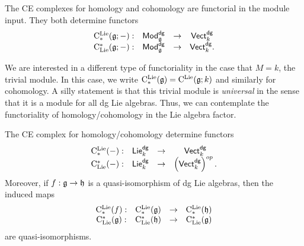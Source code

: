 \documentclass[11pt]{amsart}
\def\dgVect{{\sf Vect}^{\sf dg}}
\def\dgLie{{\sf Lie}^{\sf dg}}
\def\dgMod{{\sf Mod}^{\sf dg}}
\begin{document}
\subsubsection{}

The CE complexes for homology and cohomology are functorial in the module input.
They both determine functors
\[
\begin{array}{cccc}
\clieu_*(\fg ; -) : & \dgMod_\fg & \to & \dgVect_k\\
\clie^*(\fg ; -) : & \dgMod_{\fg} & \to & \dgVect_k .
\end{array}
\]

We are interested in a different type of functoriality in the case that $M = k$, the trivial module. 
In this case, we write ${\rm C}^{\rm Lie}_*(\mathfrak g) = {\rm C}^{\rm Lie}(\mathfrak g;k)$ and similarly for cohomology.
A silly statement is that this trivial module is {\em universal} in the sense that it is a module for all dg Lie algebras.
Thus, we can contemplate the functoriality of homology/cohomology in the Lie algebra factor. 

\begin{lem}
The CE complex for homology/cohomology determine functors
\[
\begin{array}{cccc}
\clieu_*(-) : & \dgLie_k & \to & \dgVect_k\\
\clie^*(-) : & \dgLie_k & \to & \left(\dgVect_k\right)^{op} .
\end{array}
\]
Moreover, if $f : \mathfrak g \to \mathfrak h$ is a quasi-isomorphism of dg Lie algebras, then the induced maps
\[
\begin{array}{cccc}
{\rm C}^{\rm Lie}_*(f) : & {\rm C}^{\rm Lie}_*(\mathfrak g) & \to & {\rm C}^{\rm Lie}_*(\mathfrak h)\\
{\rm C}_{{\rm Lie}}^*(\mathfrak g) : & {\rm C}_{{\rm Lie}}^*(\mathfrak h) & \to & {\rm C}_{{\rm Lie}}^*(\mathfrak g) 
\end{array}
\]
are quasi-isomorphisms. 
\end{lem}


%  

\end{document}
